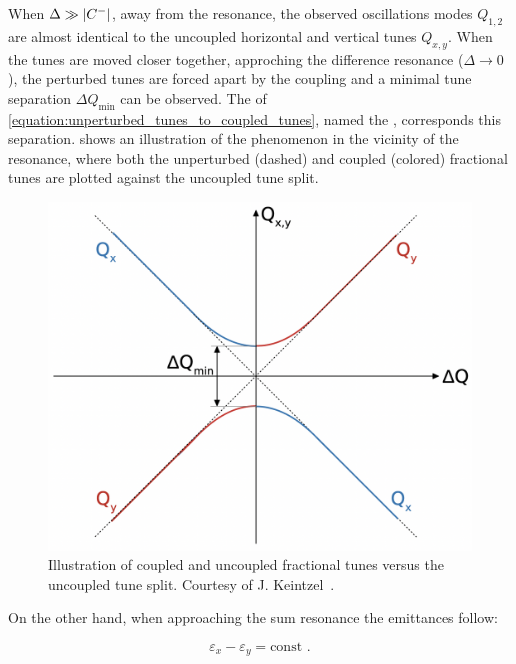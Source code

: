 When \(\Delta \gg \left\lvert C^{-} \right\rvert\), away from the resonance, the observed oscillations modes \(Q_{1,2}\) are almost identical to the uncoupled horizontal and vertical tunes \(Q_{x,y}\).
When the tunes are moved closer together, approching the difference resonance (\(\Delta \rightarrow 0\)), the perturbed tunes are forced apart by the coupling and a minimal tune separation \(\Delta Q_{\mathrm{min}}\) can be observed.
The \AbsCminus of \cref{equation:unperturbed_tunes_to_coupled_tunes}, named the , corresponds this separation.
 shows an illustration of the phenomenon in the vicinity of the resonance, where both the unperturbed (dashed) and coupled (colored) fractional tunes are plotted against the uncoupled tune split.
\begin{figure}[!htb]
    \begin{center}
    \includegraphics[width = 0.9\linewidth]{Figures/Beam_Dynamics_Theory/closest_tune_approach_schematic.png}
    \caption{Illustration of coupled and uncoupled fractional tunes versus the uncoupled tune split. Courtesy of J. Keintzel~\cite{PHD:Keintzel}.}
    \label{figure:closest_tune_approach}
    \end{center}
\end{figure}

On the other hand, when approaching the sum resonance the emittances follow:

\begin{equation}
    \varepsilon_x - \varepsilon_y = \mathrm{const} \text{ .}
    \label{equation:coupled_emittances_sum_resonance}
\end{equation}

